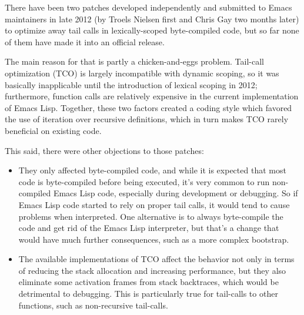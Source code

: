 \documentclass[format=acmsmall, review]{acmart}
\newcommand \Elisp {Emacs Lisp}
\begin{document}
There have been two patches developed independently and submitted to Emacs
maintainers in late 2012 (by Troels Nielsen first and Chris Gay two months
later) to optimize away tail calls in lexically-scoped byte-compiled code,
but so far none of them have made it into an official release.

The main reason for that is partly a chicken-and-eggs problem.  Tail-call
optimization (TCO) is largely incompatible with dynamic scoping, so it was
basically inapplicable until the introduction of lexical scoping in 2012;
furthermore, function calls are relatively expensive in the current
implementation of \Elisp{}.  Together, these two factors created a coding
style which favored the use of iteration over recursive definitions, which
in turn makes TCO rarely beneficial on existing code.

This said, there were other objections to those patches:
\begin{itemize}
\item They only affected byte-compiled code, and while it is expected that
  most code is byte-compiled before being executed, it's very common to run
  non-compiled \Elisp{} code, especially during development or debugging.
  So if \Elisp{} code started to rely on proper tail calls, it would tend to cause problems
  when interpreted.  One alternative is to always byte-compile the code and
  get rid of the \Elisp{} interpreter, but that's a change that would have
  much further consequences, such as a more complex bootstrap.
\item The available implementations of TCO affect the behavior not only in
  terms of reducing the stack
  allocation and increasing performance, but they also eliminate some
  activation frames from stack backtraces, which would be detrimental to
  debugging.  This is particularly true for tail-calls to
  other functions, such as non-recursive tail-calls.
\end{itemize}
\end{document}
